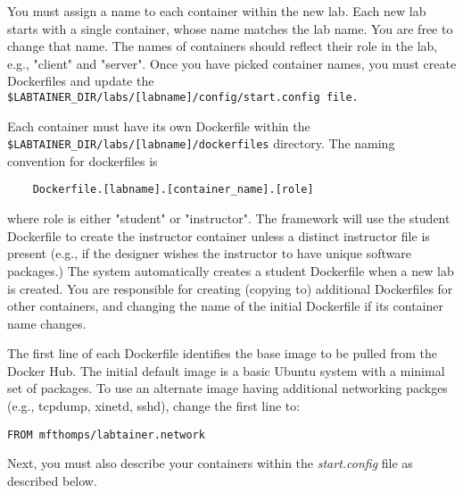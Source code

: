 \documentclass{article}
\begin{document}
You must assign a name to each container within the new lab.  Each new lab
starts with a single container, whose name matches the lab name.  You are free
to change that name. The names of containers should reflect their role in the lab,
e.g., "client" and "server".  Once you have picked container names, you must create
Dockerfiles and update the \verb!$LABTAINER_DIR/labs/[labname]/config/start.config file.!

Each container must have its own Dockerfile within the \verb!$LABTAINER_DIR/labs/[labname]/dockerfiles!
directory.  The naming convention for dockerfiles is
\begin{verbatim}
    Dockerfile.[labname].[container_name].[role]
\end{verbatim}
where role is either "student" or "instructor".  The framework will use the student Dockerfile to
create the instructor container unless a distinct instructor file is present (e.g., if the designer
wishes the instructor to have unique software packages.) The system automatically creates a student Dockerfile
when a new lab is created.  You are responsible for creating (copying to) additional Dockerfiles for other containers,
and changing the name of the initial Dockerfile if its container name changes.

The first line of each Dockerfile identifies the base image to be pulled from the Docker Hub.
The initial default image is a basic Ubuntu system with a minimal set of packages.  To use an
alternate image having additional networking packges (e.g., tcpdump, xinetd, sshd), change the first line to:
\begin{verbatim}
FROM mfthomps/labtainer.network
\end{verbatim}

Next, you must also describe your containers within the \textit{start.config} file as described below.
\end{document}
